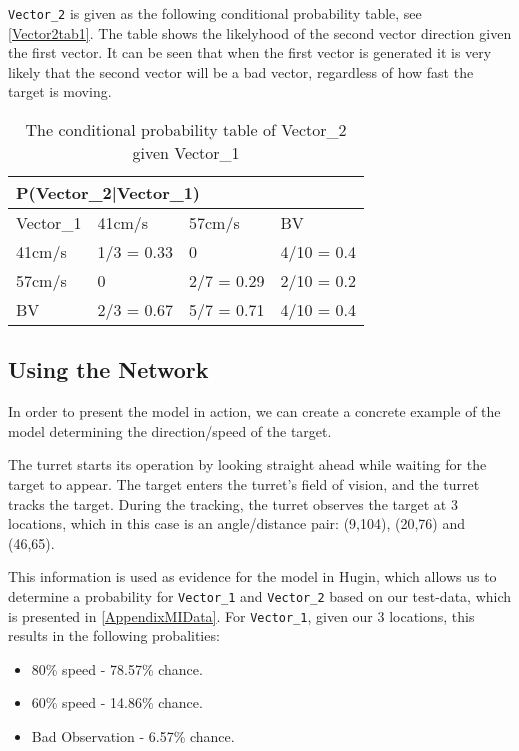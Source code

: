 \texttt{Vector\_2} is given as the following conditional probability table, see
\autoref{Vector2tab1}. The table shows the likelyhood of the second vector
direction given the first vector. It can be seen that when the first vector is
generated it is very likely that the second vector will be a
bad vector, regardless of how fast the target is moving.

\begin{table}[H]
\centering
\begin{tabular}{|l|l|l|l|}
\hline
\multicolumn{4}{|l|}{P(Vector\_2|Vector\_1)} \\ \hline
 Vector\_1 & 41cm/s    & 57cm/s    & BV    \\ \hline
 41cm/s    & 1/3 = 0.33 & 0     & 4/10 = 0.4    \\ \hline
 57cm/s    & 0          & 2/7 = 0.29 & 2/10 = 0.2  \\ \hline
 BV        & 2/3 = 0.67 & 5/7 = 0.71 & 4/10 = 0.4  \\ \hline
\end{tabular}
\caption{The conditional probability table of Vector\_2 given Vector\_1}
\label{vector2tab1}
\end{table}


\subsection{Using the Network}
In order to present the model in action, we can create a concrete example of the
model determining the direction/speed of the target.\nl

The turret starts its operation by looking straight ahead while waiting for the
target to appear. The target enters the turret's field of vision, and the turret
tracks the target. During the tracking, the turret observes the target at 3
locations, which in this case is an angle/distance pair: (9,104), (20,76) and
(46,65).\nl

This information is used as evidence for the model in Hugin, which allows
us to determine a probability for \texttt{Vector\_1} and \texttt{Vector\_2}
based on our test-data, which is presented in \autoref{AppendixMIData}. For
\texttt{Vector\_1}, given our 3 locations, this results in the following
probalities:

\begin{itemize}
  \item 80\% speed - 78.57\% chance.
  \item 60\% speed - 14.86\% chance.
  \item Bad Observation - 6.57\% chance.
\end{itemize}

